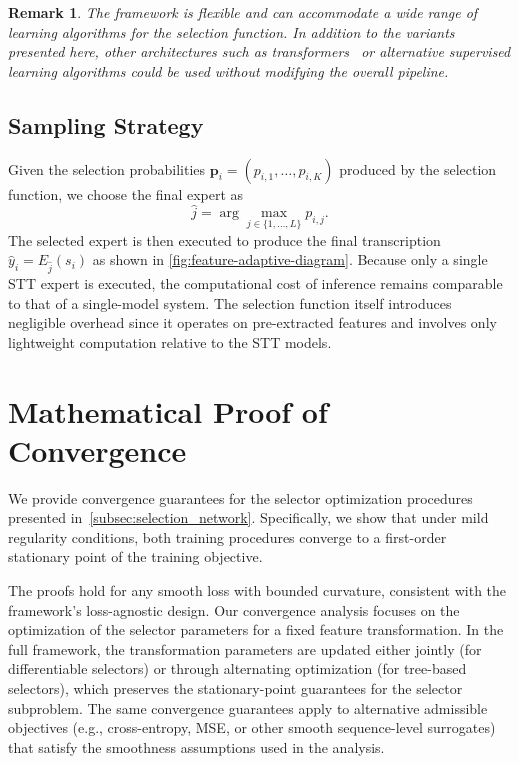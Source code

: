 \documentclass[journal]{IEEEtran}
\newtheorem{remark}{Remark}
\begin{document}
    \begin{remark}
        The framework is flexible and can accommodate a wide range of learning algorithms
        for the selection function. In addition to the variants presented here, other
        architectures such as transformers~\cite{vaswani2017attention} or alternative
        supervised learning algorithms could be used without modifying the overall
        pipeline.
    \end{remark}

    \subsection{Sampling Strategy}
    \label{subsec:sampling}

    Given the selection probabilities $\mathbf{p}_{i}= (p_{i,1},\dots,p_{i,K})$
    produced by the selection function, we choose the final expert as
    \[
        \hat{j}= \arg\max_{j \in \{1,\dots,L\}}p_{i,j}.
    \]
    The selected expert is then executed to produce the final transcription $\hat
    {y}_{i}= E_{\hat{j}}(s_{i})$ as shown in \cref{fig:feature-adaptive-diagram}.
    Because only a single STT expert is executed, the computational cost of inference
    remains comparable to that of a single-model system. The selection function
    itself introduces negligible overhead since it operates on pre-extracted
    features and involves only lightweight computation relative to the STT
    models.
    
    \section{Mathematical Proof of Convergence}
    \label{subsec:theoretic}

    We provide convergence guarantees for the selector optimization procedures
    presented in~\cref{subsec:selection_network}. Specifically, we show that
    under mild regularity conditions, both training procedures converge to a first-order
    stationary point of the training objective.

    The proofs hold for any smooth loss with bounded curvature, consistent with the framework's loss-agnostic design. Our convergence analysis focuses on the
    optimization of the selector parameters for a fixed feature transformation. In
    the full framework, the transformation parameters are updated either jointly
    (for differentiable selectors) or through alternating optimization (for tree-based
    selectors), which preserves the stationary-point guarantees for the selector
    subproblem. The same convergence guarantees apply to alternative admissible
    objectives (e.g., cross-entropy, MSE, or other smooth sequence-level surrogates)
    that satisfy the smoothness assumptions used in the analysis.
    
\end{document}
